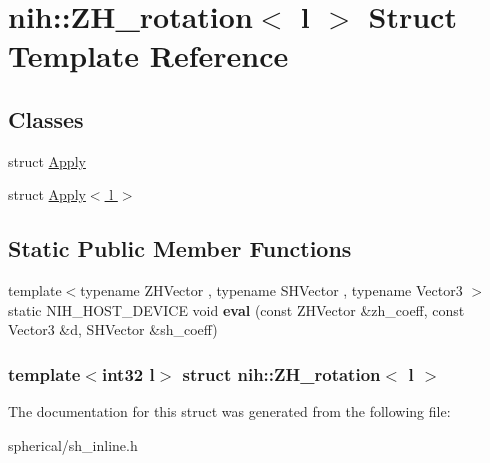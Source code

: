 \hypertarget{structnih_1_1_z_h__rotation}{
\section{nih\-:\-:\-Z\-H\-\_\-rotation$<$ l $>$ \-Struct \-Template \-Reference}
\label{structnih_1_1_z_h__rotation}
}
\subsection*{\-Classes}
\begin{DoxyCompactItemize}
\item 
struct \hyperlink{structnih_1_1_z_h__rotation_1_1_apply}{\-Apply}
\item 
struct \hyperlink{structnih_1_1_z_h__rotation_1_1_apply_3_01l_01_4}{\-Apply$<$ l $>$}
\end{DoxyCompactItemize}
\subsection*{\-Static \-Public \-Member \-Functions}
\begin{DoxyCompactItemize}
\item 
\hypertarget{structnih_1_1_z_h__rotation_a7c9183edef6e97233ea6b19330f6172d}{
{\footnotesize template$<$typename Z\-H\-Vector , typename S\-H\-Vector , typename Vector3 $>$ }\\static \-N\-I\-H\-\_\-\-H\-O\-S\-T\-\_\-\-D\-E\-V\-I\-C\-E void {\bfseries eval} (const \-Z\-H\-Vector \&zh\-\_\-coeff, const \-Vector3 \&d, \-S\-H\-Vector \&sh\-\_\-coeff)}
\label{structnih_1_1_z_h__rotation_a7c9183edef6e97233ea6b19330f6172d}

\end{DoxyCompactItemize}
\subsubsection*{template$<$int32 l$>$ struct nih\-::\-Z\-H\-\_\-rotation$<$ l $>$}



\-The documentation for this struct was generated from the following file\-:\begin{DoxyCompactItemize}
\item 
spherical/sh\-\_\-inline.\-h\end{DoxyCompactItemize}
